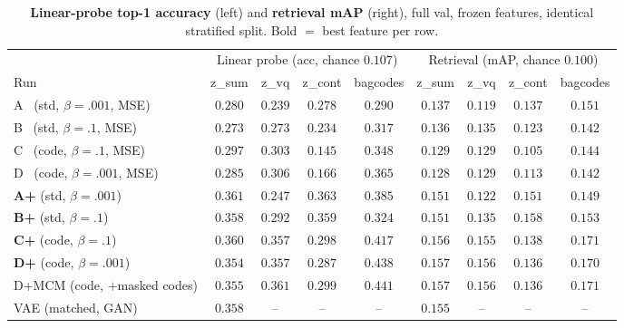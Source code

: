 \documentclass[11pt]{article}
\newcommand{\good}[1]{\textcolor{green!55!black}{#1}}
\newcommand{\bad}[1]{\textcolor{red!70!black}{#1}}
\begin{document}
\begin{table}[h]
\centering
\caption{\textbf{Linear-probe top-1 accuracy} (left) and \textbf{retrieval mAP} (right),
full val, frozen features, identical stratified split. Bold $=$ best feature per row.}
\label{tab:downstream}
\small
\setlength{\tabcolsep}{4pt}
\begin{tabular}{lcccc@{\hskip 1.5em}cccc}
\toprule
 & \multicolumn{4}{c}{Linear probe (acc, chance $0.107$)} & \multicolumn{4}{c}{Retrieval (mAP, chance $0.100$)}\\
\cmidrule(r){2-5}\cmidrule(l){6-9}
Run & z\_sum & z\_vq & z\_cont & bagcodes & z\_sum & z\_vq & z\_cont & bagcodes\\
\midrule
A \ (std, $\beta{=}.001$, MSE)   & $0.280$ & $0.239$ & $0.278$ & \textbf{$0.290$} & $0.137$ & $0.119$ & $0.137$ & \textbf{$0.151$}\\
B \ (std, $\beta{=}.1$, MSE)     & $0.273$ & $0.273$ & $0.234$ & \textbf{$0.317$} & $0.136$ & $0.135$ & $0.123$ & \textbf{$0.142$}\\
C \ (code, $\beta{=}.1$, MSE)    & $0.297$ & $0.303$ & $0.145$ & \textbf{$0.348$} & $0.129$ & $0.129$ & $0.105$ & \textbf{$0.144$}\\
D \ (code, $\beta{=}.001$, MSE)  & $0.285$ & $0.306$ & $0.166$ & \textbf{$0.365$} & $0.128$ & $0.129$ & $0.113$ & \textbf{$0.142$}\\
\midrule
\textbf{A+} (std, $\beta{=}.001$)  & $0.361$ & \bad{$0.247$} & $0.363$ & \textbf{$0.385$} & $0.151$ & \bad{$0.122$} & $0.151$ & \textbf{$0.149$}\\
\textbf{B+} (std, $\beta{=}.1$)    & $0.358$ & \bad{$0.292$} & $0.359$ & \textbf{$0.324$} & $0.151$ & $0.135$ & \textbf{$0.158$} & $0.153$\\
\textbf{C+} (code, $\beta{=}.1$)   & $0.360$ & $0.357$ & $0.298$ & \textbf{$0.417$} & $0.156$ & $0.155$ & $0.138$ & \textbf{$0.171$}\\
\textbf{D+} (code, $\beta{=}.001$) & $0.354$ & $0.357$ & $0.287$ & \good{\textbf{$0.438$}} & $0.157$ & $0.156$ & $0.136$ & \textbf{$0.170$}\\
\midrule
D+MCM (code, $+$masked codes) & $0.355$ & $0.361$ & $0.299$ & \good{\textbf{$0.441$}} & $0.157$ & $0.156$ & $0.136$ & \textbf{$0.171$}\\
VAE (matched, GAN)            & $0.358$ & --      & --      & --      & $0.155$ & --      & --      & --\\
\bottomrule
\end{tabular}
\end{table}
\end{document}
